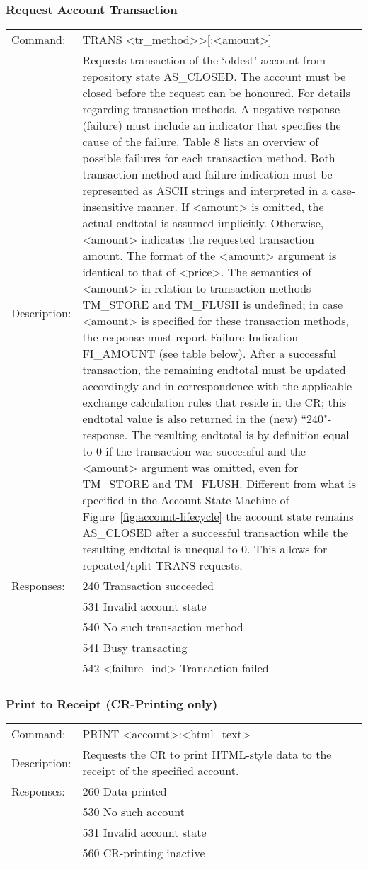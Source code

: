 \subsubsection*{Request Account Transaction}
\begin{tabular}{lp{350px}}
Command: & TRANS <tr\_method>>[:<amount>] \\
Description: & Requests transaction of the `oldest' account from repository state AS\_CLOSED. The account must be closed before the request can be honoured. For details regarding transaction methods. A negative response (failure) must include an indicator that specifies the cause of the failure. Table 8 lists an overview of possible failures for each transaction method. Both transaction method and failure indication must be represented as ASCII strings and interpreted in a case-insensitive manner. If <amount> is omitted, the actual endtotal is assumed implicitly. Otherwise, <amount> indicates the requested transaction amount. The format of the <amount> argument is identical to that of <price>. The semantics of <amount> in relation to transaction methods TM\_STORE and TM\_FLUSH is undefined; in case <amount> is specified for these transaction methods, the response must report Failure Indication FI\_AMOUNT (see table below). After a successful transaction, the remaining endtotal must be updated accordingly and in correspondence with the applicable exchange calculation rules that reside in the CR; this endtotal value is also returned in the (new) ``240"-response. The resulting endtotal is by definition equal to 0 if the transaction was successful and the <amount> argument was omitted, even for TM\_STORE and TM\_FLUSH.
Different from what is specified in the Account State Machine of Figure~\ref{fig:account-lifecycle} the account state remains AS\_CLOSED after a successful transaction while the resulting endtotal is unequal to 0. This allows for repeated/split TRANS requests. \\
Responses: & 240 Transaction succeeded \\
& 531 Invalid account state \\
& 540 No such transaction method \\
& 541 Busy transacting \\
& 542 <failure\_ind> Transaction failed
\end{tabular}

\subsubsection*{Print to Receipt (CR-Printing only)}
\begin{tabular}{lp{350px}}
Command: & PRINT <account>:<html\_text> \\
Description: & Requests the CR to print HTML-style data to the receipt of the specified account. \\
Responses: & 260 Data printed \\
& 530 No such account \\
& 531 Invalid account state  \\
& 560 CR-printing inactive
\end{tabular}

